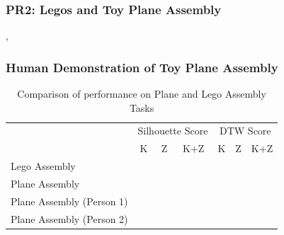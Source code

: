 \subsubsection{PR2: Legos and Toy Plane Assembly}
, 


\subsubsection{Human Demonstration of Toy Plane Assembly}



\begin{table}[ht]
\centering
\caption{Comparison of \TSC performance on Plane and Lego Assembly Tasks}
\label{tab:pr2}
\begin{tabular}{l|l|l|l|l|l|l}
\multicolumn{1}{c}{}                                     &     \multicolumn{3}{c}{\cellcolor[HTML]{CBCEFB}Silhouette Score} & \multicolumn{3}{c}{\cellcolor[HTML]{FFC72C}DTW Score}\\
\multicolumn{1}{c}{}    & \multicolumn{1}{c|}{K} & \multicolumn{1}{c|}{Z} & \multicolumn{1}{c|}{K+Z}& \multicolumn{1}{c|}{K} & \multicolumn{1}{c|}{Z} & \multicolumn{1}{c}{K+Z} \\ \hline \hline 
\rowcolor[HTML]{E0E0E0}
 Lego Assembly     & &    &   &   &  &    \\ 
 Plane Assembly   & &    &   &   &  &    \\ 
\rowcolor[HTML]{E0E0E0}
 Plane Assembly (Person 1) & &    &   &   &  &    \\ 
 Plane Assembly (Person 2)      & &    &   &   &  &    \\  \hline
\end{tabular}
\end{table}


